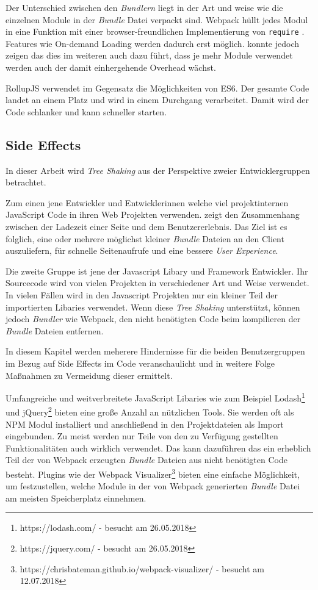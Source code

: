 Der Unterschied zwischen den \textit{Bundlern} liegt in der Art und weise wie die einzelnen Module in der \textit{Bundle} Datei verpackt sind. Webpack hüllt jedes Modul in eine Funktion mit einer browser-freundlichen Implementierung von \lstinline{require} \autocite{RichHarris}. Features wie On-demand Loading werden dadurch erst möglich. \textcite{NolanLawson} konnte jedoch zeigen das dies im weiteren auch dazu führt, dass je mehr Module verwendet werden auch der damit einhergehende Overhead wächst.

RollupJS verwendet im Gegensatz die Möglichkeiten von ES6. Der gesamte Code landet an einem Platz und wird in einem Durchgang verarbeitet. Damit wird der Code schlanker und kann schneller starten. \autocite{RichHarris}

\subsection{Side Effects}
\label{subsection:side_effects}
In dieser Arbeit wird \textit{Tree Shaking} aus der Perspektive zweier Entwicklergruppen betrachtet. 

Zum einen jene Entwickler und Entwicklerinnen welche viel projektinternen JavaScript Code in ihren Web Projekten verwenden. \textcite{Nielson1997} zeigt den Zusammenhang zwischen der Ladezeit einer Seite und dem Benutzererlebnis. Das Ziel ist es folglich, eine oder mehrere möglichst kleiner \textit{Bundle} Dateien an den Client auszuliefern, für schnelle Seitenaufrufe und eine bessere \textit{User Experience}.

Die zweite Gruppe ist jene der Javascript Libary und Framework Entwickler. Ihr Sourcecode wird von vielen Projekten in verschiedener Art und Weise verwendet. In vielen Fällen wird in den Javascript Projekten nur ein kleiner Teil der importierten Libaries verwendet. Wenn diese \textit{Tree Shaking} unterstützt, können jedoch \textit{Bundler} wie Webpack, den nicht benötigten Code beim kompilieren der \textit{Bundle} Dateien entfernen.

In diesem Kapitel werden meherere Hindernisse für die beiden Benutzergruppen im Bezug auf Side Effects im Code veranschaulicht und in weitere Folge Maßnahmen zu Vermeidung dieser ermittelt. 

Umfangreiche und weitverbreitete JavaScript Libaries wie zum Beispiel Lodash\footnote{https://lodash.com/ - besucht am 26.05.2018} und jQuery\footnote{https://jquery.com/ - besucht am 26.05.2018} bieten eine große Anzahl an nützlichen Tools. Sie werden oft als NPM Modul installiert und anschließend in den Projektdateien als Import eingebunden. Zu meist werden nur Teile von den zu Verfügung gestellten Funktionalitäten auch wirklich verwendet. Das kann dazuführen das ein erheblich Teil der von Webpack erzeugten \textit{Bundle} Dateien aus nicht benötigten Code besteht. Plugins wie der Webpack Visualizer\footnote{https://chrisbateman.github.io/webpack-visualizer/ - besucht am 12.07.2018} bieten eine einfache Möglichkeit, um festzustellen, welche Module in der von Webpack generierten \textit{Bundle} Datei am meisten Speicherplatz einnehmen.

